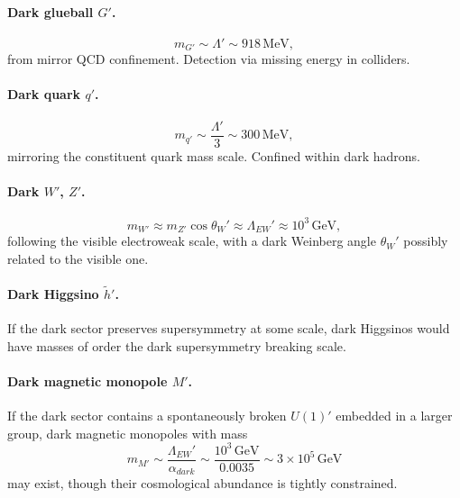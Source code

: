 \documentclass[a4paper,7pt,oneside,openany]{book}
\begin{document}
\paragraph{Dark glueball \texorpdfstring{$G'$}{G'}.}
\begin{equation}
m_{G'}
\sim
\Lambda'
\sim
918\,\text{MeV},
\label{eq:mG'-tier3}
\end{equation}
from mirror QCD confinement. Detection via missing energy in 
colliders.

\paragraph{Dark quark \texorpdfstring{$q'$}{q'}.}
\begin{equation}
m_{q'}
\sim
\frac{\Lambda'}{3}
\sim
300\,\text{MeV},
\label{eq:mq'-tier3}
\end{equation}
mirroring the constituent quark mass scale. Confined within dark 
hadrons.

\paragraph{Dark \texorpdfstring{$W'$}{W'}, \texorpdfstring{$Z'$}{Z'}.}
\begin{equation}
m_{W'}
\approx
m_{Z'}
\cos\theta_{W}'
\approx
\Lambda_{EW}'
\approx
10^{3}\,\text{GeV},
\label{eq:mW'-tier3}
\end{equation}
following the visible electroweak scale, with a dark Weinberg 
angle $\theta_{W}'$ possibly related to the visible one.

\paragraph{Dark Higgsino \texorpdfstring{$\tilde{h}'$}{h'}.}
If the dark sector preserves supersymmetry at some scale, dark 
Higgsinos would have masses of order the dark supersymmetry 
breaking scale.

\paragraph{Dark magnetic monopole \texorpdfstring{$M'$}{M'}.}
If the dark sector contains a spontaneously broken $U(1)'$ 
embedded in a larger group, dark magnetic monopoles with mass
\begin{equation}
m_{M'}
\sim
\frac{\Lambda_{EW}'}{\alpha_{dark}}
\sim
\frac{10^{3}\,\text{GeV}}{0.0035}
\sim
3\times 10^{5}\,\text{GeV}
\label{eq:mM'-tier3}
\end{equation}
may exist, though their cosmological abundance is tightly 
constrained.
\end{document}
